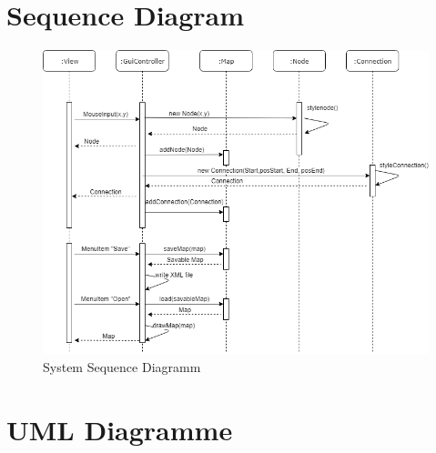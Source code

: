 \section{Sequence Diagram}
\label{sec:sequence_diagram}
\begin{figure}[H]
	\centering
		\includegraphics[scale=0.6]{images/sequence.png}
	\caption{System Sequence Diagramm}
	\label{fig:domain_model}
\end{figure}

\section{UML Diagramme}
\label{sec:uml_diagramme}